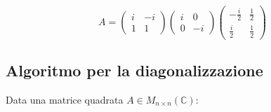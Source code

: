 \documentclass[a4paper]{article}
\theoremstyle{break}
\theoremstyle{break}
\theoremstyle{break}
\theoremstyle{break}
\begin{document}
\begin{example}
\begin{itemize}
      \[
      A =
      \begin{pmatrix} 
        i & -i\\
        1 & 1
      \end{pmatrix} 
      \begin{pmatrix} 
        i & 0\\
        0 & -i
      \end{pmatrix} 
      \begin{pmatrix} 
        -\frac{i}{2} & \frac{1}{2}\\
        \frac{i}{2} & \frac{1}{2}
      \end{pmatrix} 
      \] 
  \end{itemize}
\end{example}

\subsection{Algoritmo per la diagonalizzazione}
Data una matrice quadrata \( A \in M_{n \times n}(\mathbb{C}) \):
\end{document}
